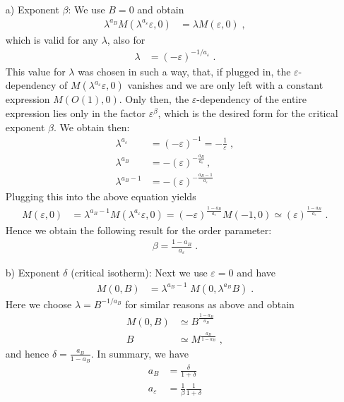 \begin{enumerate}
	\item[a)] {\color{blue}Exponent $\beta$:} We use $B=0$ and obtain
%
\begin{align*}
\lambda^{a_B} M(\lambda^{a_{\varepsilon}}\varepsilon,0) &= \lambda M(\varepsilon,0) \;,
\end{align*}
%
which is valid for any $\lambda$, also for 
%
\begin{align*}
\lambda&=(-\varepsilon)^{-1/a_{\varepsilon}}\;.
\end{align*}
%
This value for $\lambda$ was chosen in such a way, that, if plugged in, the $\varepsilon$-dependency of $M(\lambda^{a_{\varepsilon}}\varepsilon,0)$ vanishes and we are only left with a constant expression $M(O(1), 0)$. Only then, the $\varepsilon$-dependency of the entire expression lies only in the factor $\varepsilon^\beta$, which is the desired form for the critical exponent $\beta$. We obtain then:
\begin{align*}
\lambda^{a_\varepsilon} &= (-\varepsilon)^{-1} = -\frac{1}{\varepsilon} \; ,\\
\lambda^{a_B} &= -(\varepsilon)^{-\frac{a_B}{a_\varepsilon}} \, ,\\
\lambda^{a_B-1} &= -(\varepsilon)^{-\frac{a_B-1}{a_\varepsilon}}
\end{align*}
%
Plugging this into the above equation yields
\begin{align*}
M(\varepsilon,0)  &= \lambda^{a_B-1} M(\lambda^{a_{\varepsilon}}\varepsilon,0) = (-\varepsilon)^{\frac{1-a_{B}}{a_{\varepsilon}}} M(-1,0)\simeq (\varepsilon)^{\frac{1-a_{B}}{a_{\varepsilon}}} \;.
\end{align*}
%
Hence we obtain the following result for the order parameter: 
%
\begin{align*}
\beta=\frac{1-a_{B}}{a_{\varepsilon}} \;.
\end{align*}
%
\item[b)] {\color{blue}Exponent $\delta$ (critical isotherm):}
Next we use $\varepsilon=0$ and have
%
\begin{align*}
M(0,B) &= \lambda^{a_{B}-1}\;M(0,\lambda^{a_{B}}B)\;.
\end{align*}
%
Here we choose $\lambda =B^{-1/a_{B}}$ for similar reasons as above and obtain
%
\begin{align*}
M(0,B) &\simeq  B^{\frac{1-a_{B}}{a_{B}}}\\
B &\simeq M^{\frac{a_{B}}{1-a_{B}}}\;,
\end{align*}
%
and hence $\delta=\frac{a_{B}}{1-a_{B}}$.
In summary, we have
%
\begin{align}\label{eq:}
a_{B} &= \frac{\delta}{1+\delta}\\
a_{\varepsilon} &= \frac{1}{\beta}\frac{1}{1+\delta}\\
\end{align}
%
\end{enumerate}
